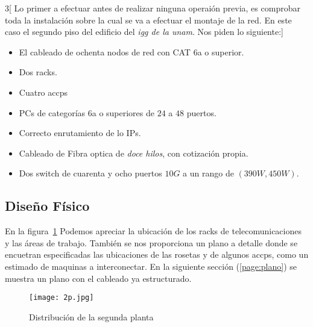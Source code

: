 \documentclass[../main.tex]{subfiles}
\begin{document}
\begin{multicols}{3}[
  Lo primer a efectuar antes de realizar ninguna operaión previa, es
  comprobar toda la instalación sobre la cual se va a efectuar el
  montaje de la red. En este caso el segundo piso del edificio del
  \textit{\acrfull{igg} de la \acrshort{unam}}. Nos piden lo siguiente:]

  \begin{itemize}
  \item El cableado de ochenta nodos de red con CAT 6a o superior.
  \item Dos \glspl{rack}.
  \item Cuatro \glspl{accp}
  \item \Glspl{PC} de categorías 6a o superiores de $24$ a $48$
    puertos.
  \item Correcto enrutamiento de lo IPs.
  \item Cableado de Fibra optica de \textit{doce hilos}, con cotización
    propia.
  \item Dos switch de cuarenta y ocho puertos $10G$ a un rango de
    $(390W, 450W)$.
    
  \end{itemize}
\end{multicols}

\subsection{Diseño Físico}\label{sec:disfis}

En la figura\ \ref{fig:dsp} Podemos apreciar
la ubicación de los racks de
telecomunicaciones y las áreas de trabajo.
También se nos proporciona un plano a detalle
donde se encuetran especificadas las
ubicaciones de las \glspl{roseta} y de
algunos \glspl{accp}, como un estimado de maquinas
a interconectar. En la siguiente sección (\ref{page:plano}) se muestra un
plano con el cableado ya estructurado.

\begin{figure}[H]
  \centering
  \texttt{[image: 2p.jpg]}
  \caption{Distribución de la segunda planta}\label{fig:dsp}
\end{figure}
\end{document}
